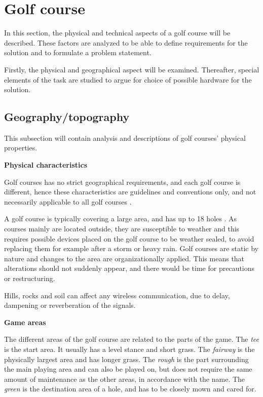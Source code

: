 \section{Golf course}
In this section, the physical and technical aspects of a golf course will be described. These factors are analyzed to be able to define requirements for the solution and to formulate a problem statement.

Firstly, the physical and geographical aspect will be examined. Thereafter, special elements of the task are studied to argue for choice of possible hardware for the solution. 

\subsection{Geography/topography}
This subsection will contain analysis and descriptions of golf courses' physical properties.

\textbf{Physical characteristics}

Golf courses has no strict geographical requirements, and each golf course is different, hence these characteristics are guidelines and conventions only, and not necessarily applicable to all golf courses \cite{golfCourse}.

A golf course is typically covering a large area, and has up to 18 holes \cite{golfCourse}. As courses mainly are located outside, they are susceptible to weather and this requires possible devices placed on the golf course to be weather sealed, to avoid replacing them for example after a storm or heavy rain. Golf courses are static by nature and changes to the area are organizationally applied. This means that alterations should not suddenly appear, and there would be time for precautions or restructuring.

Hills, rocks and soil can affect any wireless communication, due to delay, dampening or reverberation of the signals. 

\textbf{Game areas}

The different areas of the golf course are related to the parts of the game. The \textit{tee} is the start area. It usually has a level stance and short grass. The \textit{fairway} is the physically largest area and has longer grass. The \textit{rough} is the part surrounding the main playing area and can also be played on, but does not require the same amount of maintenance as the other areas, in accordance with the name. The \textit{green} is the destination area of a hole, and has to be closely mown and cared for. 

